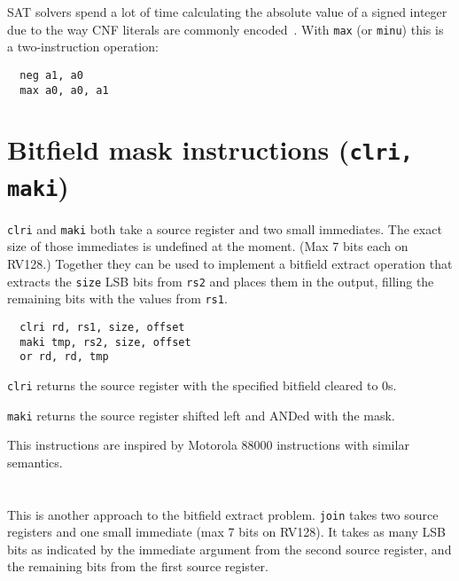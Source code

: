 SAT solvers spend a lot of time calculating the absolute value of a signed
integer due to the way CNF literals are commonly encoded~\cite{BiereComm}. With
\texttt{max} (or \texttt{minu}) this is a two-instruction operation:

\begin{verbatim}
  neg a1, a0
  max a0, a0, a1
\end{verbatim}




\section{Bitfield mask instructions (\texttt{clri, maki})}

{\tt clri} and {\tt maki} both take a source register and two small immediates.
The exact size of those immediates is undefined at the moment. (Max 7 bits each
on RV128.) Together they can be used to implement a bitfield extract operation
that extracts the {\tt size} LSB bits from {\tt rs2} and places them in the
output, filling the remaining bits with the values from {\tt rs1}.

\begin{verbatim}
  clri rd, rs1, size, offset
  maki tmp, rs2, size, offset
  or rd, rd, tmp
\end{verbatim}

{\tt clri} returns the source register with the specified bitfield cleared to 0s.

{\tt maki} returns the source register shifted left and ANDed with the mask.



This instructions are inspired by Motorola 88000 instructions with similar semantics.


\section{}

This is another approach to the bitfield extract problem. {\tt join} takes two
source registers and one small immediate (max 7 bits on RV128). It takes as many
LSB bits as indicated by the immediate argument from the second source register,
and the remaining bits from the first source register.

